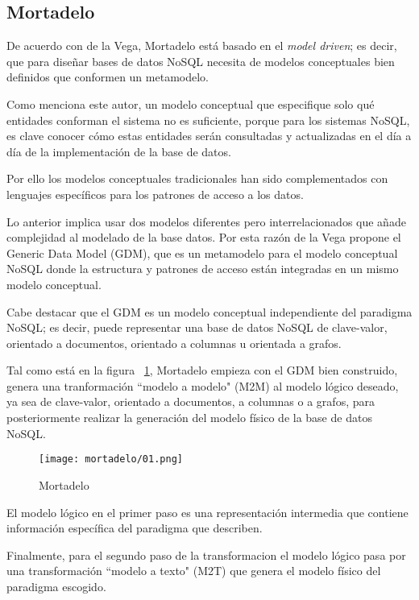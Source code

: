\subsection{Mortadelo}
De acuerdo con de la Vega\cite{de_la_vega_mortadelo_2020}, Mortadelo está basado en el \textit{model driven}; es decir, que para diseñar bases de datos NoSQL necesita de modelos conceptuales bien definidos que conformen un metamodelo.


Como menciona este autor, un modelo conceptual que especifique solo qué entidades conforman el sistema no es suficiente, porque para los sistemas NoSQL, es clave conocer cómo estas entidades serán consultadas y actualizadas en el día a día de la implementación de la base de datos.


Por ello los modelos conceptuales tradicionales han sido complementados con lenguajes específicos para los patrones de acceso a los datos.


Lo anterior implica usar dos modelos diferentes pero interrelacionados que añade complejidad al modelado de la base datos. Por esta razón de la Vega propone el Generic Data Model (GDM), que es un metamodelo para el modelo conceptual NoSQL donde la estructura y patrones de acceso están integradas en un mismo modelo conceptual.


Cabe destacar que el GDM es un modelo conceptual independiente del paradigma NoSQL; es decir, puede representar una base de datos NoSQL de clave-valor, orientado a documentos, orientado a columnas u orientada a grafos.


Tal como está en la figura ~\ref{img:mortadelo-process}, Mortadelo empieza con el GDM bien construido, genera una tranformación ``modelo a modelo" (M2M) al modelo lógico deseado, ya sea de clave-valor, orientado a documentos, a columnas o a grafos, para posteriormente realizar la generación del modelo físico de la base de datos NoSQL.


\begin{figure}[h!t] 
    \centering
    \texttt{[image: mortadelo/01.png]}
    \caption{Mortadelo}
    \label{img:mortadelo-process}
\end{figure}


El modelo lógico en el primer paso es una representación intermedia que contiene información específica del paradigma que describen.


Finalmente, para el segundo paso de la transformacion el modelo lógico pasa por una transformación ``modelo a texto"  (M2T) que genera el modelo físico del paradigma escogido.